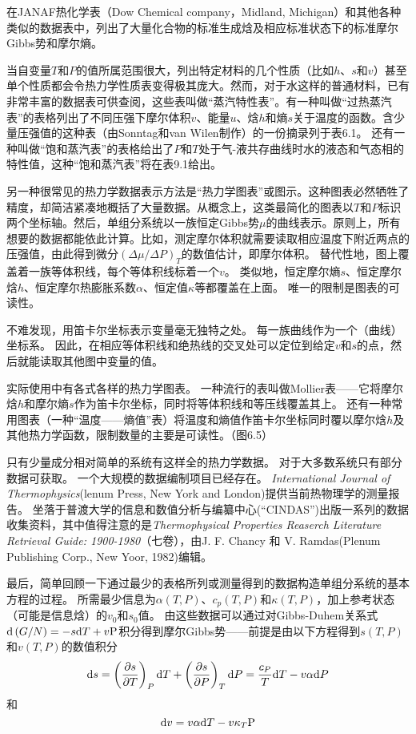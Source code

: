 在JANAF热化学表（Dow Chemical company，Midland, Michigan）和其他各种类似的数据表中，列出了大量化合物的标准生成焓及相应标准状态下的标准摩尔Gibbs势和摩尔熵。

当自变量$T$和$P$的值所属范围很大，列出特定材料的几个性质（比如$h$、$s$和$v$）甚至单个性质都会令热力学性质表变得极其庞大。然而，对于水这样的普通材料，已有非常丰富的数据表可供查阅，这些表叫做“蒸汽特性表”。有一种叫做“过热蒸汽表”的表格列出了不同压强下摩尔体积$v$、能量$u$、焓$h$和熵$s$关于温度的函数。含少量压强值的这种表（由Sonntag和van Wilen制作）的一份摘录列于表6.1。%
还有一种叫做“饱和蒸汽表”的表格给出了$P$和$T$处于气-液共存曲线时水的液态和气态相的特性值，这种“饱和蒸汽表”将在表9.1给出。%

另一种很常见的热力学数据表示方法是“热力学图表”或图示。这种图表必然牺牲了精度，却简洁紧凑地概括了大量数据。从概念上，这类最简化的图表以$T$和$P$标识两个坐标轴。然后，单组分系统以一族恒定Gibbs势$\mu$的曲线表示。原则上，所有想要的数据都能依此计算。比如，测定摩尔体积就需要读取相应温度下附近两点的压强值，由此得到微分$\left(\Delta\mu/\Delta P\right)_T$的数值估计，即摩尔体积。
替代性地，图上覆盖着一族等体积线，每个等体积线标着一个$v$。
类似地，恒定摩尔熵$s$、恒定摩尔焓$h$、恒定摩尔热膨胀系数$\alpha$、恒定值$\kappa$等都覆盖在上面。
唯一的限制是图表的可读性。

不难发现，用笛卡尔坐标表示变量毫无独特之处。
每一族曲线作为一个（曲线）坐标系。
因此，在相应等体积线和绝热线的交叉处可以定位到给定$v$和$s$的点，然后就能读取其他图中变量的值。

实际使用中有各式各样的热力学图表。
一种流行的表叫做Mollier表——它将摩尔焓$h$和摩尔熵$s$作为笛卡尔坐标，同时将等体积线和等压线覆盖其上。
还有一种常用图表（一种“温度——熵值”表）将温度和熵值作笛卡尔坐标同时覆以摩尔焓$h$及其他热力学函数，限制数量的主要是可读性。（图6.5）%

只有少量成分相对简单的系统有这样全的热力学数据。
对于大多数系统只有部分数据可获取。
一个大规模的数据编制项目已经存在。
\textit{International Journal of Thermophysics}(lenum Press, New York and London)提供当前热物理学的测量报告。
坐落于普渡大学的信息和数值分析与编纂中心(“CINDAS”)出版一系列的数据收集资料，其中值得注意的是\textit{Thermophysical Properties Reaserch Literature Retrieval Guide: 1900-1980}（七卷），由J. F. Chancy 和 V. Ramdas(Plenum Publishing Corp., New Yoor, 1982)编辑。

最后，简单回顾一下通过最少的表格所列或测量得到的数据构造单组分系统的基本方程的过程。
所需最少信息为$\alpha(T,P)$、$c_p(T,P)$和$\kappa(T,P)$，加上参考状态（可能是信息焓）的$v_0$和$s_0$值。
由这些数据可以通过对Gibbs-Duhem关系式$\mathrm{d} \left(G/N\right)=-s\mathrm{d} T+v\text{P}$积分得到摩尔Gibbs势——前提是由以下方程得到$s(T,P)$和$v(T,P)$的数值积分
\[\mathrm{d} s=\left(\frac{\partial s}{\partial T}\right)_P\mathrm{d} T+\left(\frac{\partial s}{\partial P}\right)_T\mathrm{d} P=\frac{c_P}{T}\mathrm{d} T-v\alpha\mathrm{d} P\]
和
\[\mathrm{d} v=v\alpha\mathrm{d} T-v\kappa_T\text{P}\]

